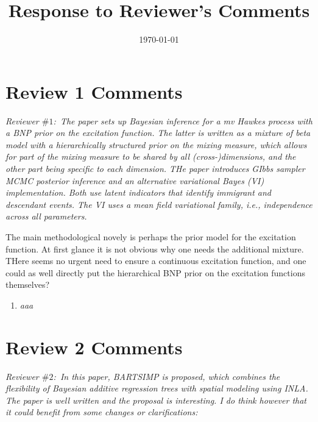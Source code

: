 \documentclass[12pt]{article}
\title{Response to Reviewer's Comments}
\date{\today}
\begin{document}
\maketitle
\newpage


\section*{Review 1 Comments}

{\it Reviewer $\#1$:~The paper sets up Bayesian inference for a mv Hawkes process with a BNP prior on the excitation function. The latter is written as a mixture of beta model with a hierarchically structured prior on the mixing measure, which allows for part of the mixing measure to be shared by all (cross-)dimensions, and the other part being specific to each dimension.
THe paper introduces GIbbs sampler MCMC posterior inference and an alternative variational Bayes (VI) implementation. Both use latent indicators that identify immigrant and descendant events. The VI uses a mean field variational family, i.e., independence across all parameters.

The main methodological novely is perhaps the prior model for the excitation function. At first glance it is not obvious why one needs the additional mixture. THere seems no urgent need to ensure a continuous excitation function, and one could as well directly put the hierarchical BNP prior on the excitation functions themselves?}


\begin{enumerate}
    \item {\it aaa}
\end{enumerate}
\clearpage
\section*{Review 2 Comments}

{\it Reviewer $\#2$:~In this paper, BARTSIMP is proposed, which combines the flexibility of Bayesian additive regression trees with spatial modeling using INLA. The paper is well written and the proposal is interesting. I do think however that it could benefit from some changes or clarifications:}
\end{document}

